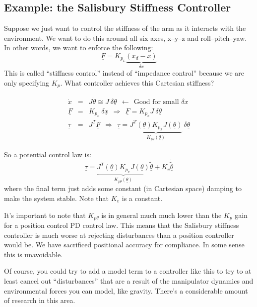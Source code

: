 \documentclass[]{article}
\begin{document}
\subsection{Example: the Salisbury Stiffness Controller}

Suppose we just want to control the stiffness of the arm as it interacts with the environment. We want to do this around all six axes, x--y--z and roll--pitch--yaw. In other words, we want to enforce the following:
\begin{displaymath}
 \underline{F} = K_{p_{x}} \underbrace{(x_{d} - x)}_{\delta x}
\end{displaymath}
This is called ``stiffness control'' instead of ``impedance control'' because we are only specifying $K_{p}$. What controller achieves this Cartesian stiffness?

\begin{eqnarray}
 \dot{x} & = & J\dot{\theta} \cong J\ \delta\underline{\theta}\ \  \leftarrow\ \  \text{Good for small $\delta x$} \nonumber \\
 \underline{F} & = & K_{p_{x}}\ \delta\underline{x}\ \  \Rightarrow\ \  \underline{F} = K_{p_{x}}J\ \delta\underline{\theta} \nonumber \\
 \underline{\tau} & = & J^{T}\underline{F}\ \ \Rightarrow\ \ \underline{\tau} = \underbrace{J^{T}(\underline{\theta})K_{p_{x}}J(\underline{\theta})}_{K_{p\theta} (\underline{\theta})}\ \delta\underline{\theta} \nonumber
\end{eqnarray}

So a potential control law is:
\begin{displaymath}
 \underline{\tau} = \underbrace{J^{T}(\underline{\theta})K_{p_{x}}J(\underline{\theta})}_{K_{p\theta} (\underline{\theta})}\underline{\tilde{\theta}} + K_{v}\dot{\tilde{\underline{\theta}}}
\end{displaymath}
where the final term just adds some constant (in Cartesian space) damping to make the system stable. Note that $K_{v}$ is a constant.

It's important to note that $K_{p\theta}$ is in general much much lower than the $K_{p}$ gain for a position control PD control law. This means that the Salisbury stiffness controller is much worse at rejecting disturbances than a position controller would be. We have sacrificed positional accuracy for compliance. In some sense this is unavoidable.

Of course, you could try to add a model term to a controller like this to try to at least cancel out ``disturbances'' that are a result of the manipulator dynamics and environmental forces you can model, like gravity. There's a considerable amount of research in this area.
\end{document}
